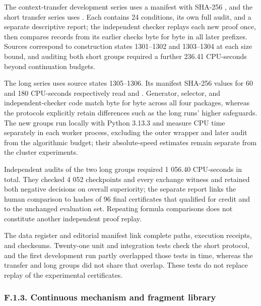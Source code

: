\documentclass[pdflatex,sn-basic,Numbered]{sn-jnl}
\begin{document}
The context-transfer development series uses a manifest with SHA-256 , and the short transfer series uses . Each contains 24 conditions, its own full audit, and a separate descriptive report; the independent checker replays each new proof once, then compares records from its earlier checks byte for byte in all later prefixes. Sources correspond to construction states 1301--1302 and 1303--1304 at each size bound, and auditing both short groups required a further 236.41 CPU-seconds beyond continuation budgets.

The long series uses source states 1305--1306. Its manifest SHA-256 values for 60 and 180 CPU-seconds respectively read  and . Generator, selector, and independent-checker code match byte for byte across all four packages, whereas the protocols explicitly retain differences such as the long runs' higher safeguards. The new groups run locally with Python 3.13.3 and measure CPU time separately in each worker process, excluding the outer wrapper and later audit from the algorithmic budget; their absolute-speed estimates remain separate from the cluster experiments.

Independent audits of the two long groups required 1 056.40 CPU-seconds in total. They checked 4 052 checkpoints and every exchange witness and retained both negative decisions on overall superiority; the separate report  links the human comparison to hashes of 96 final certificates that qualified for credit and to the unchanged evaluation set. Repeating formula comparisons does not constitute another independent proof replay.

The data register and editorial manifest link complete paths, execution receipts, and checksums. Twenty-one unit and integration tests check the short protocol, and the first development run partly overlapped those tests in time, whereas the transfer and long groups did not share that overlap. These tests do not replace replay of the experimental certificates.

\subsubsection*{F.1.3. Continuous mechanism and fragment library}\label{f.1.3.-continuous-mechanism-and-fragment-library}
\end{document}
